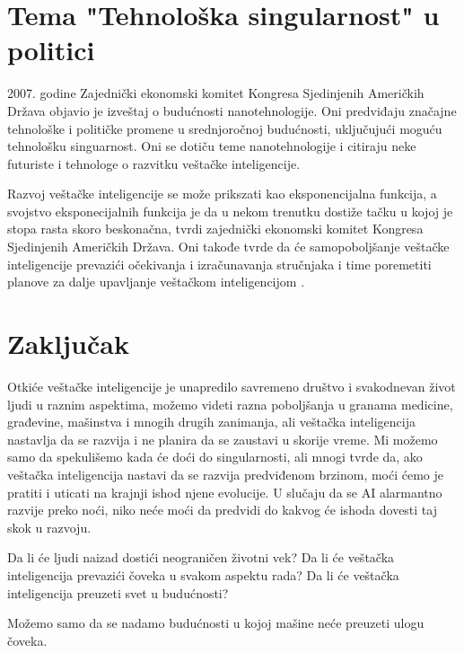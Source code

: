 \documentclass[a4paper]{article}
\begin{document}
\section{Tema "Tehnološka singularnost" u politici}
\label{sec:politika}
2007. godine Zajednički ekonomski komitet Kongresa Sjedinjenih Američkih Država objavio je izveštaj o budućnosti nanotehnologije. Oni predviđaju značajne tehnološke i političke promene u srednjoročnoj budućnosti, uključujući moguću tehnološku singuarnost. Oni se dotiču teme nanotehnologije i citiraju neke futuriste i tehnologe o razvitku veštačke inteligencije.

Razvoj veštačke inteligencije se može prikszati kao eksponencijalna funkcija, a svojstvo eksponecijalnih funkcija je da u nekom trenutku dostiže tačku u kojoj je stopa rasta skoro beskonačna, tvrdi zajednički ekonomski komitet Kongresa Sjedinjenih Američkih Država. Oni takođe tvrde da će samopoboljšanje veštačke inteligencije prevazići očekivanja i izračunavanja stručnjaka i time poremetiti planove za dalje upavljanje veštačkom inteligencijom
\cite{ref21}.

\section{Zaključak}
\label{sec:zakljucak}
Otkiće veštačke inteligencije je unapredilo savremeno društvo i svakodnevan život ljudi u raznim aspektima, možemo videti razna poboljšanja u granama medicine, građevine, mašinstva i mnogih drugih zanimanja, ali veštačka inteligencija nastavlja da se razvija i ne planira da se zaustavi u skorije vreme. Mi možemo samo da spekulišemo kada će doći do singularnosti, ali mnogi tvrde da, ako veštačka inteligencija nastavi da se razvija predviđenom brzinom, moći ćemo je pratiti i uticati na krajnji ishod njene evolucije. U slučaju da se AI alarmantno razvije preko noći, niko neće moći da predvidi do kakvog će ishoda dovesti taj skok u razvoju.

Da li će ljudi naizad dostići neograničen životni vek? Da li će veštačka inteligencija prevazići čoveka u svakom aspektu rada? Da li će veštačka inteligencija preuzeti svet u budućnosti?

Možemo samo da se nadamo budućnosti u kojoj mašine neće preuzeti ulogu čoveka.

\appendix

\end{document}
